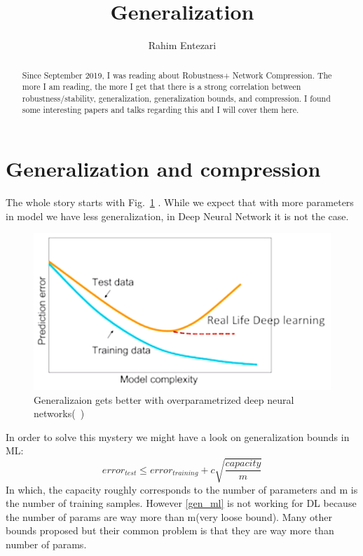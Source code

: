 \documentclass{article} %
\title{Generalization}
\author{Rahim Entezari}
\newcommand{\figref}[1]{Fig.~\ref{#1}}
\begin{document}
\maketitle

\begin{abstract}
Since September 2019, I was reading about Robustness+ Network Compression. The more I am reading, the more I get that there is a strong correlation between robustness/stability, generalization, generalization bounds, and compression. I found some interesting papers and talks regarding this and I will cover them here.
\end{abstract}

\section{Generalization and compression}
The whole story starts with \figref{generalization_mystery} . While we expect that with more parameters in model we have less generalization, in Deep Neural Network it is not the case.

\begin{figure}[h]
\begin{center}
\includegraphics[width=0.5\columnwidth]{pix/ICML2019Slides.png}
\caption{Generalizaion gets better with overparametrized deep neural networks(~\cite{arora2018stronger})}
\end{center}
\label{generalization_mystery}
\end{figure}

In order to solve this mystery we might have a look on generalization bounds in ML:
\begin{equation}
	error_{test} \leq error_{training} + c \sqrt{\frac{capacity}{m}}
\label{gen_ml}
\end{equation}
In which, the capacity roughly corresponds to the number of parameters and m is the number of training samples.
However \eqref{gen_ml} is not working for DL because the number of params are way more than m(very loose bound). Many other bounds proposed but their common problem is that they are way more than number of params.
\end{document}
